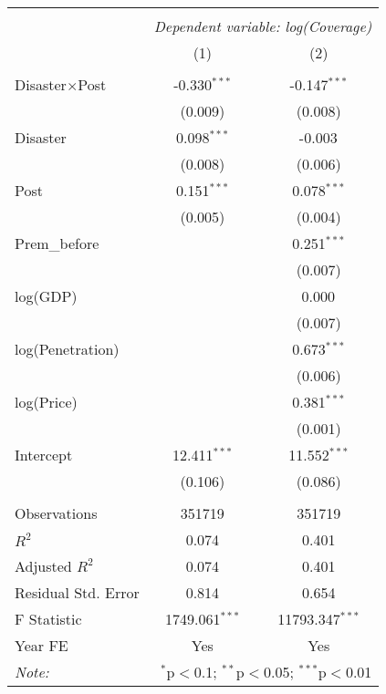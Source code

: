 
\begin{tabular}{@{\extracolsep{5pt}}lcc}
\\[-1.8ex]\hline
\hline \\[-1.8ex]
& \multicolumn{2}{c}{\textit{Dependent variable: log(Coverage)}} \
\cr \cline{2-3}
\\[-1.8ex] & (1) & (2) \\
\hline \\[-1.8ex]
Disaster$\times$Post & -0.330$^{***}$ & -0.147$^{***}$ \\
& (0.009) & (0.008) \\
 Disaster & 0.098$^{***}$ & -0.003$^{}$ \\
& (0.008) & (0.006) \\
 Post & 0.151$^{***}$ & 0.078$^{***}$ \\
& (0.005) & (0.004) \\
 Prem\_before & & 0.251$^{***}$ \\
& & (0.007) \\
 log(GDP) & & 0.000$^{}$ \\
& & (0.007) \\
 log(Penetration) & & 0.673$^{***}$ \\
& & (0.006) \\
 log(Price) & & 0.381$^{***}$ \\
& & (0.001) \\
Intercept & 12.411$^{***}$ & 11.552$^{***}$ \\
& (0.106) & (0.086) \\
\hline \\[-1.8ex]
 Observations & 351719 & 351719 \\
 $R^2$ & 0.074 & 0.401 \\
 Adjusted $R^2$ & 0.074 & 0.401 \\
 Residual Std. Error & 0.814  & 0.654  \\
 F Statistic & 1749.061$^{***}$  & 11793.347$^{***}$  \\
    Year FE & Yes & Yes \\
\hline
\hline
\textit{Note:} & \multicolumn{2}{r}{$^{*}$p$<$0.1; $^{**}$p$<$0.05; $^{***}$p$<$0.01} \\
\end{tabular}
